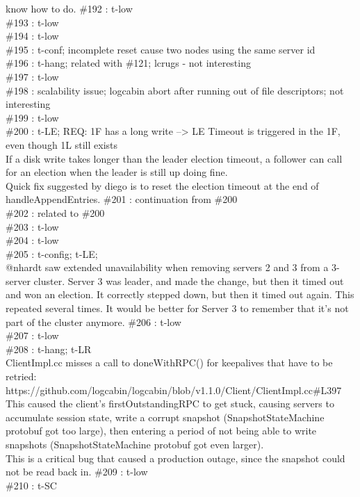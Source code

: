know how to do.
\#192 : t-low\\
\#193 : t-low\\
\#194 : t-low\\
\#195 : t-conf; incomplete reset cause two nodes using the same server id\\
\#196 : t-hang; related with \#121; lcrugs - not interesting\\
\#197 : t-low\\
\#198 : scalability issue; logcabin abort after running out of file descriptors; not interesting\\
\#199 : t-low\\
\#200 : t-LE; REQ: 1F has a long write --> LE Timeout is triggered in the 1F, even
though 1L still exists\\
If a disk write takes longer than the leader election timeout, a follower 
can call for an election when the leader is still up doing fine.\\
Quick fix suggested by diego is to reset the election timeout at the 
end of handleAppendEntries.
\#201 : continuation from \#200\\
\#202 : related to \#200\\
\#203 : t-low\\
\#204 : t-low\\
\#205 : t-config; t-LE;\\
@nhardt saw extended unavailability when removing servers 2 and 
3 from a 3-server cluster. Server 3 was leader, and made the change, 
but then it timed out and won an election. It correctly stepped down, 
but then it timed out again. This repeated several times. It would be 
better for Server 3 to remember that it's not part of the cluster 
anymore.
\#206 : t-low\\
\#207 : t-low\\
\#208 : t-hang; t-LR\\
ClientImpl.cc misses a call to doneWithRPC() for keepalives that 
have to be retried:
https://github.com/logcabin/logcabin/blob/v1.1.0/Client/ClientImpl.cc#L397
This caused the client's firstOutstandingRPC to get stuck, causing 
servers to accumulate session state, write a corrupt snapshot 
(SnapshotStateMachine protobuf got too large), then entering a 
period of not being able to write snapshots (SnapshotStateMachine 
protobuf got even larger).\\
This is a critical bug that caused a production outage, since the snapshot 
could not be read back in.
\#209 : t-low\\
\#210 : t-SC\\
